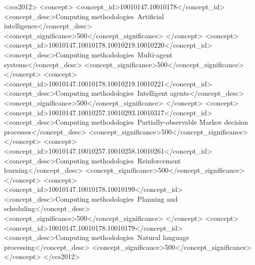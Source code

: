 \documentclass[sigconf]{acmart}
\begin{document}
%
\begin{CCSXML}
  <ccs2012>
     <concept>
         <concept_id>10010147.10010178</concept_id>
         <concept_desc>Computing methodologies~Artificial intelligence</concept_desc>
         <concept_significance>500</concept_significance>
         </concept>
     <concept>
         <concept_id>10010147.10010178.10010219.10010220</concept_id>
         <concept_desc>Computing methodologies~Multi-agent systems</concept_desc>
         <concept_significance>500</concept_significance>
         </concept>
     <concept>
         <concept_id>10010147.10010178.10010219.10010221</concept_id>
         <concept_desc>Computing methodologies~Intelligent agents</concept_desc>
         <concept_significance>500</concept_significance>
         </concept>
     <concept>
         <concept_id>10010147.10010257.10010293.10010317</concept_id>
         <concept_desc>Computing methodologies~Partially-observable Markov decision processes</concept_desc>
         <concept_significance>500</concept_significance>
         </concept>
     <concept>
         <concept_id>10010147.10010257.10010258.10010261</concept_id>
         <concept_desc>Computing methodologies~Reinforcement learning</concept_desc>
         <concept_significance>500</concept_significance>
         </concept>
     <concept>
         <concept_id>10010147.10010178.10010199</concept_id>
         <concept_desc>Computing methodologies~Planning and scheduling</concept_desc>
         <concept_significance>500</concept_significance>
         </concept>
     <concept>
         <concept_id>10010147.10010178.10010179</concept_id>
         <concept_desc>Computing methodologies~Natural language processing</concept_desc>
         <concept_significance>500</concept_significance>
         </concept>
   </ccs2012>
\end{CCSXML}




\end{document}

